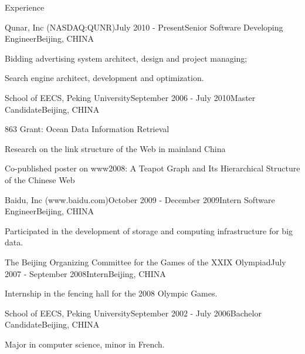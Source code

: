 \documentclass{resume} %
\begin{document}
\begin{rSection}{Experience}

\begin{rSubsection}{Qunar, Inc (NASDAQ:QUNR)}{July 2010 - Present}{Senior Software Developing Engineer}{Beijing, CHINA}
\item Bidding advertising system architect, design and project managing;
\item Search engine architect, development and optimization.
\end{rSubsection}


\begin{rSubsection}{School of EECS, Peking University}{September 2006 - July 2010}{Master Candidate}{Beijing, CHINA}
\item 863 Grant: Ocean Data Information Retrieval
\item Research on the link structure of the Web in mainland China
\item Co-published poster on www2008: A
Teapot Graph and Its Hierarchical Structure of the Chinese Web
\end{rSubsection}


\begin{rSubsection}{Baidu, Inc (www.baidu.com)}{October 2009 - December 2009}{Intern Software Engineer}{Beijing, CHINA}
\item Participated in the development of storage and computing
  infrastructure for big data.
\end{rSubsection}

\begin{rSubsection}{The Beijing Organizing Committee for the Games of
    the XXIX Olympiad}{July 2007 - September 2008}{Intern}{Beijing, CHINA}
\item Internship in the fencing hall for the 2008 Olympic Games.
\end{rSubsection}


\begin{rSubsection}{School of EECS, Peking University}{September 2002 - July 2006}{Bachelor Candidate}{Beijing, CHINA}
\item Major in computer science, minor in French.
\end{rSubsection}


\end{rSection}
\end{document}
